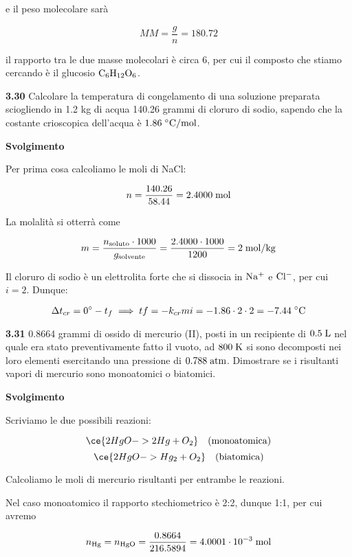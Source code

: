 e il peso molecolare sarà

$$MM=\frac{g}{n}=180.72$$

il rapporto tra le due masse molecolari è circa 6, per cui il composto che stiamo cercando è il glucosio $\rm C_6H_{12}O_6$.

\vspace{0.2cm}\textbf{3.30} Calcolare la temperatura di congelamento di una soluzione preparata sciogliendo in 1.2 kg di acqua 140.26 grammi di cloruro di sodio, sapendo che la costante crioscopica dell'acqua è $1.86 \; ^{\circ} \rm C/mol$.

\vspace{0.2cm}\large\textbf{Svolgimento}\normalsize

\vspace{0.2cm}Per prima cosa calcoliamo le moli di NaCl:

$$n=\frac{140.26}{58.44}=2.4000 \; \rm mol$$

La molalità si otterrà come

$$m=\frac{n_{\rm soluto} \cdot 1000}{g_{\rm solvente}}
=\frac{2.4000 \cdot 1000}{1200}
=2 \; \rm mol/kg$$

Il cloruro di sodio è un elettrolita forte che si dissocia in $\rm Na^+$ e $\rm Cl^-$, per cui $i=2$. Dunque:

$$\Delta t_{cr}=0^{\circ} - t_f
\implies
tf=-k_{cr} m i= - 1.86 \cdot 2 \cdot 2=-7.44 \; \rm ^{\circ}C$$

\vspace{0.2cm}\textbf{3.31} 0.8664 grammi di ossido di mercurio (II), posti in un recipiente di $0.5 \; \rm L$ nel quale era stato preventivamente fatto il vuoto, ad $800 \; \rm K$ si sono decomposti nei loro elementi esercitando una pressione di $0.788 \; \rm atm$. Dimostrare se i risultanti vapori di mercurio sono monoatomici o biatomici.

\vspace{0.2cm}\large\textbf{Svolgimento}\normalsize

\vspace{0.2cm}Scriviamo le due possibili reazioni:

$$\ce{2HgO -> 2Hg + O_2}
\quad(\text{monoatomica})$$
$$\ce{2HgO -> Hg_2 + O_2}
\quad(\text{biatomica})$$

Calcoliamo le moli di mercurio risultanti per entrambe le reazioni.

Nel caso monoatomico il rapporto stechiometrico è 2:2, dunque 1:1, per cui avremo

$$n_{\rm Hg}=n_{\rm HgO}
=\frac{0.8664}{216.5894}
=4.0001 \cdot 10^{-3} \; \rm mol$$

